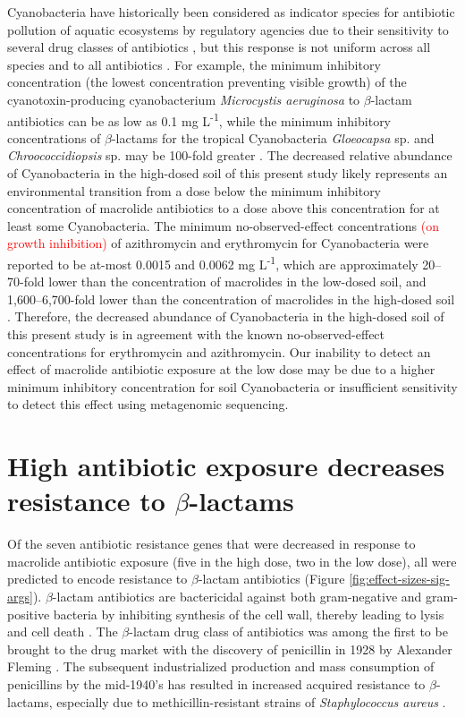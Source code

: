 Cyanobacteria have historically been considered as indicator species for antibiotic pollution of aquatic ecosystems by regulatory agencies due to their sensitivity to several drug classes of antibiotics \parencite{CommitteeforMedicinalProductsforHumanUse.2006, LePage.2017}, but this response is not uniform across all species and to all antibiotics \parencite{LePage.2017, Dias.2015}.
For example, the minimum inhibitory concentration (the lowest concentration preventing visible growth) of the cyanotoxin-producing cyanobacterium \textit{Microcystis aeruginosa} to $\beta$-lactam antibiotics can be as low as 0.1 mg L\textsuperscript{-1}, while the minimum inhibitory concentrations of $\beta$-lactams for the tropical Cyanobacteria \textit{Gloeocapsa} sp. and \textit{Chroococcidiopsis} sp. may be 100-fold greater \parencite{Dias.2015, Reynaud.1986}.
The decreased relative abundance of Cyanobacteria in the high-dosed soil of this present study likely represents an environmental transition from a dose below the minimum inhibitory concentration of macrolide antibiotics to a dose above this concentration for at least some Cyanobacteria.
The minimum no-observed-effect concentrations \textcolor{red}{(on growth inhibition)} of azithromycin and erythromycin for Cyanobacteria were reported to be at-most 0.0015 and 0.0062 mg L\textsuperscript{-1}, which are approximately 20--70-fold lower than the concentration of macrolides in the low-dosed soil, and 1,600--6,700-fold lower than the concentration of macrolides in the high-dosed soil \parencite{LePage.2019}.
Therefore, the decreased abundance of Cyanobacteria in the high-dosed soil of this present study is in agreement with the known no-observed-effect concentrations for erythromycin and azithromycin.
Our inability to detect an effect of macrolide antibiotic exposure at the low dose may be due to a higher minimum inhibitory concentration for soil Cyanobacteria or insufficient sensitivity to detect this effect using metagenomic sequencing.

\section{High antibiotic exposure decreases resistance to $\beta$-lactams}

Of the seven antibiotic resistance genes that were decreased in response to macrolide antibiotic exposure (five in the high dose, two in the low dose), all were predicted to encode resistance to $\beta$-lactam antibiotics (Figure \ref{fig:effect-sizes-sig-args}).
$\beta$-lactam antibiotics are bactericidal against both gram-negative and gram-positive bacteria by inhibiting synthesis of the cell wall, thereby leading to lysis and cell death \parencite{CapeloMartinez.2019}.
The $\beta$-lactam drug class of antibiotics was among the first to be brought to the drug market with the discovery of penicillin in 1928 by Alexander Fleming \parencite{Fleming.1929}.
The subsequent industrialized production and mass consumption of penicillins by the mid-1940's has resulted in increased acquired resistance to $\beta$-lactams, especially due to methicillin-resistant strains of \textit{Staphylococcus aureus} \parencite{PublicHealthAgencyofCanada.2020}.

